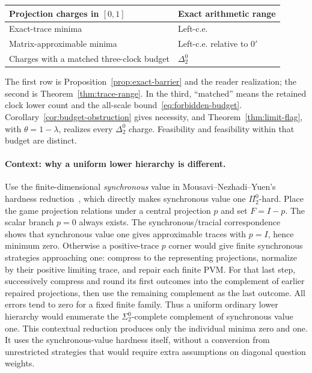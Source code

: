 \begin{center}
\small
\begin{tabular}{@{}ll@{}}
\toprule
Projection charges in $[0,1]$ & Exact arithmetic range\\
\midrule
Exact-trace minima & Left-c.e.\\
Matrix-approximable minima & Left-c.e. relative to $0'$\\
Charges with a matched three-clock budget & $\Delta^0_2$\\
\bottomrule
\end{tabular}
\end{center}
The first row is Proposition~\ref{prop:exact-barrier} and the reader realization; the second is Theorem~\ref{thm:trace-range}. In the third, ``matched'' means the retained clock lower count and the all-scale bound~\eqref{eq:forbidden-budget}. Corollary~\ref{cor:budget-obstruction} gives necessity, and Theorem~\ref{thm:limit-flag}, with $\theta=1-\lambda$, realizes every $\Delta^0_2$ charge. Feasibility and feasibility within that budget are distinct.

\paragraph{Context: why a uniform lower hierarchy is different.}
Use the finite-dimensional \emph{synchronous} value in Mousavi--Nezhadi--Yuen's hardness reduction~\cite[Lemma~6.7]{MNY22}, which directly makes synchronous value one $\Pi^0_2$-hard. Place the game projection relations under a central projection $p$ and set $F=I-p$. The scalar branch $p=0$ always exists. The synchronous/tracial correspondence~\cite{PSSSTW16,KPS18} shows that synchronous value one gives approximable traces with $p=I$, hence minimum zero. Otherwise a positive-trace $p$ corner would give finite synchronous strategies approaching one: compress to the representing projections, normalize by their positive limiting trace, and repair each finite PVM. For that last step, successively compress and round its first outcomes into the complement of earlier repaired projections, then use the remaining complement as the last outcome. All errors tend to zero for a fixed finite family. Thus a uniform ordinary lower hierarchy would enumerate the $\Sigma^0_2$-complete complement of synchronous value one. This contextual reduction produces only the individual minima zero and one. It uses the synchronous-value hardness itself, without a conversion from unrestricted strategies that would require extra assumptions on diagonal question weights.

